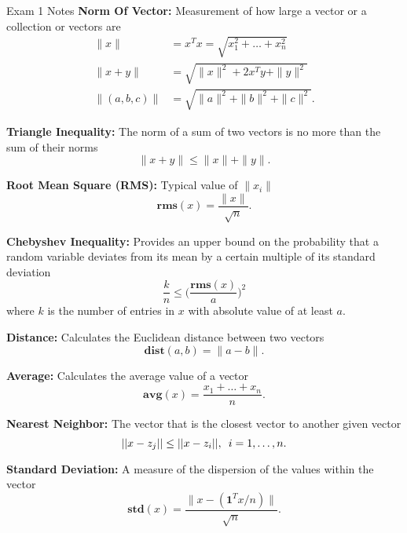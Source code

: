 \begin{examnotes}{Exam 1 Notes}
    \textbf{Norm Of Vector:} Measurement of how large a vector or a collection or vectors are
    \begin{align*}
        \|x\| & = x^{T}x = \sqrt{x_{1}^{2} + \dots + x_{n}^{2}} \\
        \|x + y\| & = \sqrt{\|x\|^{2} + 2x^{T}y + \|y\|^2} \\
        \|(a,b,c)\| & = \sqrt{\|a\|^{2} + \|b\|^{2} + \|c\|^{2}}.
    \end{align*}

    \textbf{Triangle Inequality:} The norm of a sum of two vectors is no more than the sum of their norms
    \begin{equation*}
        \|x + y\| \leq \|x\| + \|y\|.
    \end{equation*}

    \textbf{Root Mean Square (RMS):} Typical value of $\|x_{i}\|$
    \begin{equation*}
        \mathbf{rms}(x) = \frac{\|x\|}{\sqrt{n}}.
    \end{equation*}

    \textbf{Chebyshev Inequality:} Provides an upper bound on the probability that a random variable deviates from its mean by a certain multiple of its standard deviation
    \begin{equation*}
        \frac{k}{n} \leq \Bigg(\frac{\mathbf{rms}(x)}{a} \Bigg)^{2}
    \end{equation*}
    where $k$ is the number of entries in $x$ with absolute value of at least $a$.

    \textbf{Distance:} Calculates the Euclidean distance between two vectors
    \begin{equation*}
        \mathbf{dist}(a,b) = \|a - b\|.
    \end{equation*}

    \textbf{Average:} Calculates the average value of a vector
    \begin{equation*}
        \mathbf{avg}(x) = \frac{x_{1} + \dots + x_{n}}{n}.
    \end{equation*}

    \textbf{Nearest Neighbor:} The vector that is the closest vector to another given vector
    \begin{equation*}
        ||x - z_{j}|| \leq ||x - z_{i}||, \hspace*{5pt} i = 1,\dots,n.
    \end{equation*}

    \textbf{Standard Deviation:} A measure of the dispersion of the values within the vector
    \begin{equation*}
        \mathbf{std}(x) = \frac{\|x - (\mathbf{1}^{T}x/n)\|}{\sqrt{n}}.
    \end{equation*}


\end{examnotes}
